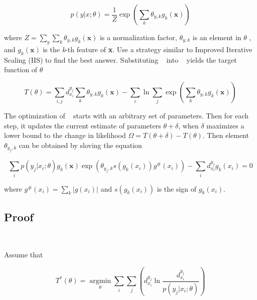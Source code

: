 \begin{equation}\label{eq:max_entropy}
p(y|x;{\theta}) = \dfrac{1}{Z}
\exp ( \sum\limits_{k}
{\theta}_{y,k} 
g_{k}( \textbf{x})  )
\end{equation}

where $ Z = \sum _{y}
\sum_{k}  {\theta}_{y,k}  g_{k}( \textbf{x}) $
is a normalization factor,
$ {\theta}_{y,k} $ is an element in \textbf {$\theta$} ,
and $ g_{k}( \textbf{x}) $ is the \textit{k}-th feature of\textbf{ x}.
Use a strategy similar to Improved Iterative Scaling (IIS) 
\cite{Della}
to find the best answer.
Substituting ~ into 
~
yields the target function of $ \theta $

\begin{equation}\label{eq:target_function}
T(\theta) =
\sum\limits_{i,j}
d^{y_{j}}_{ x_{ i } }
\sum\limits_{k}
{\theta}_{y,k} 
g_{k}( \textbf{x})
-
\sum\limits_{i}
\ln\sum\limits_{j}
\exp(\sum\limits_{k}
{\theta}_{y,k} 
g_{k}( \textbf{x}))
\end{equation}

The optimization of 
~
starts with an arbitrary set of parameters.
Then for each step,
it updates the current estimate of
parameters $ \theta +\delta$,
when $\delta$ maximizes a lower bound to
the change in likelihood
$\Omega = T(\theta+\delta) - T(\theta)$.
Then element $\theta_{y_{j},k}$
can be obtained by sloving the equation

\begin{equation}
\sum\limits_{i}
p( y_{ j } | x_{ i } ;{\theta})
g_{k}( \textbf{x})
\exp(
\theta_{y_{j},k}
s(g_{k}(x_{i}))
g^{\#}(x_{i}) )-
\sum\limits_{i}
d^{y_{j}}_{ x_{ i } }
g_{k}(x_{i}) = 0
\end{equation}

where 
$ g^{\#}(x_{i})=\sum\limits_{k}
|g(x_{i})| $
and 
$s(g_{k}(x_{i}) )$
is the sign of 
$g_{k}(x_{i}) $.


\subsection{Proof}
\

Assume that 

\begin{equation}
T^{\ast}(\theta) =
\mathop{\arg\min}\limits_{\theta}
\sum\limits_{i}
\sum\limits_{j}
(d^{y_{j}}_{ x_{ i } }
\ln \dfrac{ d^{y_{j}}_{ x_{ i } } }{ p( y_{ j } | x_{ i } ;{\theta}) })
\end{equation}

